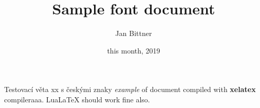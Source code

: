 \documentclass[12pt]{article}
\title{Sample font document}
\author{Jan Bittner}
\date{this month, 2019}
\begin{document}
 
 \maketitle
 
Testovací věta xx s českými znaky \textit{example} of document compiled 
with \textbf{xelatex} compileraaa. LuaLaTeX should 
work fine also.
 
\end{document}
